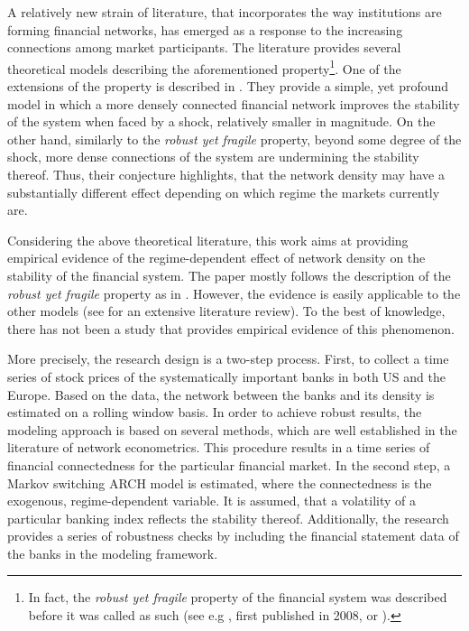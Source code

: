 \documentclass[12pt]{article}
\begin{document}
A relatively new strain of literature, that incorporates the way institutions are forming financial networks, has emerged as a response to the increasing connections among market participants. The literature provides several theoretical models describing the aforementioned property\footnote{In fact, the \textit{robust yet fragile} property of the financial system was described before it was called as such (see e.g \cite{gai10}, first published in 2008, or \cite{gallegati08}).}. One of the extensions of the property is described in \cite{acemoglu13}. They provide a simple, yet profound model in which a more densely connected financial network improves the stability of the system when faced by a shock, relatively smaller in magnitude. On the other hand, similarly to the \textit{robust yet fragile} property, beyond some degree of the shock, more dense connections of the system are undermining the stability thereof. Thus, their conjecture highlights, that the network density may have a substantially different effect depending on which regime the markets currently are. 

Considering the above theoretical literature, this work aims at providing empirical evidence of the regime-dependent effect of network density on the stability of the financial system. The paper mostly follows the description of the \textit{robust yet fragile} property as in \cite{acemoglu13}. However, the evidence is easily applicable to the other models (see \cite{glasserman16} for an extensive literature review). To the best of knowledge, there has not been a study that provides empirical evidence of this phenomenon.

More precisely, the research design is a two-step process. First, to collect a time series of stock prices of the systematically important banks in both US and the Europe. Based on the data, the network between the banks and its density is estimated on a rolling window basis. In order to achieve robust results, the modeling approach is based on several methods, which are well established in the literature of network econometrics. This procedure results in a time series of financial connectedness for the particular financial market. In the second step, a Markov switching ARCH model is estimated, where the connectedness is the exogenous, regime-dependent variable. It is assumed, that a volatility of a particular banking index reflects the stability thereof. Additionally, the research provides a series of robustness checks by including the financial statement data of the banks in the modeling framework.
\end{document}
